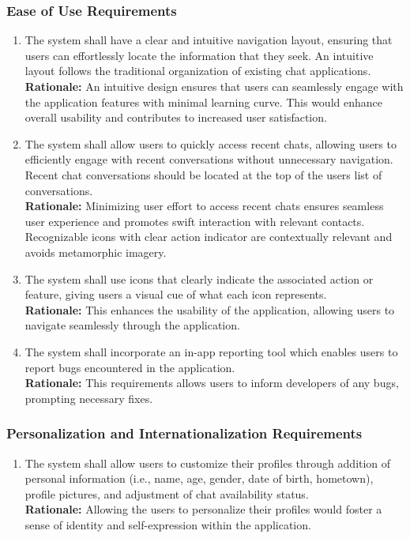 \documentclass[]{article}
\begin{document}
\subsubsection{Ease of Use Requirements}
\label{ssub:ease_of_use_requirements}
\begin{enumerate}[{UH-EOU}1. ]
    \item The system shall have a clear and intuitive navigation layout, ensuring that users can effortlessly locate 
    the information that they seek. An intuitive layout follows the traditional organization of existing chat applications. \\
    {\bf Rationale:} An intuitive design ensures that users can seamlessly engage with the application features with minimal learning curve. 
    This would enhance overall usability and contributes to increased user satisfaction. 
    \item The system shall allow users to quickly access recent chats, allowing users to efficiently engage with recent 
    conversations without unnecessary navigation. Recent chat conversations should be located at the top of the users list of conversations.\\
    {\bf Rationale:} Minimizing user effort to access recent chats ensures seamless user experience and promotes swift interaction 
    with relevant contacts. Recognizable icons with clear action indicator are contextually relevant and avoids metamorphic imagery. 
    \item The system shall use icons that clearly indicate the associated action or feature, giving users a visual cue of what each icon represents. \\
    {\bf Rationale:} This enhances the usability of the application, allowing users to navigate seamlessly through the application. 
    \item The system shall incorporate an in-app reporting tool which enables users to report bugs encountered in the application.\\
    {\bf Rationale:} This requirements allows users to inform developers of any bugs, prompting necessary fixes.
\end{enumerate} 
\subsubsection{Personalization and Internationalization Requirements}
\label{ssub:personalization_and_internationalization_requirements}
\begin{enumerate}[{UH-PI}1. ]
    \item The system shall allow users to customize their profiles through addition of personal information (i.e., name, age, gender, date of birth, hometown), profile pictures, and adjustment of chat availability status. \\
    {\bf Rationale:} Allowing the users to personalize their profiles would foster a sense of identity and self-expression within the application.
\end{enumerate}
\end{document}
